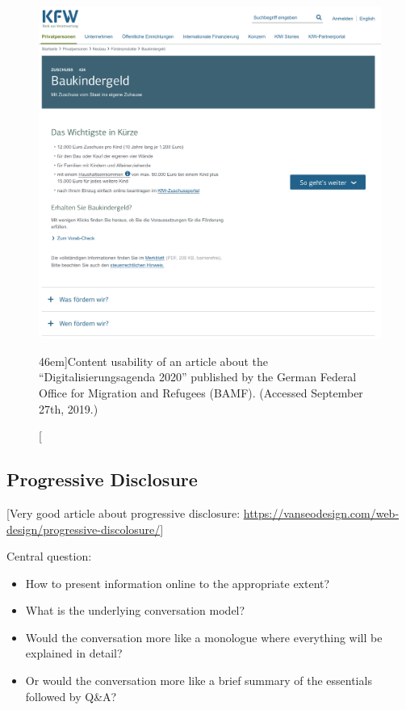 \newpage
\begin{figure}[!h]%
  \includegraphics[width=1.54\textwidth]{../figures/content_usability_kfw.png}
  \caption[][46em]{Content usability of an article about the ``Digitalisierungsagenda 2020'' published by the German Federal Office for Migration and Refugees (BAMF). (Accessed September 27th, 2019.) }
  \label{fig:content_usability_kfw}
\end{figure}



\newpage
\subsection{Progressive Disclosure} %
\label{sub:progressive_disclosure}

[Very good article about progressive disclosure: \url{https://vanseodesign.com/web-design/progressive-discolosure/}]

Central question:
\begin{itemize}
	\item How to present information online to the appropriate extent?
	\item What is the underlying conversation model?
	\item Would the conversation more like a monologue where everything will be explained in detail?
	\item Or would the conversation more like a brief summary of the essentials followed by Q\&A?
\end{itemize}
 


